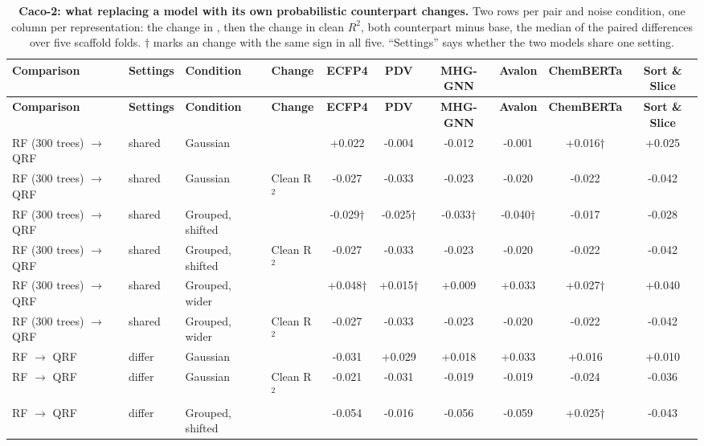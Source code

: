 \begin{landscape}
{\AFtablefont
\begin{longtable}{llllcccccc}
\caption{\textbf{Caco-2: what replacing a model with its own probabilistic counterpart changes.}
Two rows per pair and noise condition, one column per representation: the change in \aucnorm{}, then the change in clean $R^2$, both counterpart minus base, the median of the paired differences over five scaffold folds. $\dagger$ marks an \aucnorm{} change with the same sign in all five. ``Settings'' says whether the two models share one setting.}
\label{app:noise:counterparts_caco2}\\
\toprule
\textbf{Comparison} & \textbf{Settings} & \textbf{Condition} & \textbf{Change} & \textbf{ECFP4} & \textbf{PDV} & \textbf{MHG-GNN} & \textbf{Avalon} & \textbf{ChemBERTa} & \textbf{Sort \& Slice} \\
\midrule
\endfirsthead
\toprule
\textbf{Comparison} & \textbf{Settings} & \textbf{Condition} & \textbf{Change} & \textbf{ECFP4} & \textbf{PDV} & \textbf{MHG-GNN} & \textbf{Avalon} & \textbf{ChemBERTa} & \textbf{Sort \& Slice} \\
\midrule
\endhead
RF (300 trees) $\rightarrow$ QRF & shared & Gaussian & \aucnorm{} & +0.022 & -0.004 & -0.012 & -0.001 & +0.016† & +0.025 \\
RF (300 trees) $\rightarrow$ QRF & shared & Gaussian & Clean R$^2$ & -0.027 & -0.033 & -0.023 & -0.020 & -0.022 & -0.042 \\
RF (300 trees) $\rightarrow$ QRF & shared & Grouped, shifted & \aucnorm{} & -0.029† & -0.025† & -0.033† & -0.040† & -0.017 & -0.028 \\
RF (300 trees) $\rightarrow$ QRF & shared & Grouped, shifted & Clean R$^2$ & -0.027 & -0.033 & -0.023 & -0.020 & -0.022 & -0.042 \\
RF (300 trees) $\rightarrow$ QRF & shared & Grouped, wider & \aucnorm{} & +0.048† & +0.015† & +0.009 & +0.033 & +0.027† & +0.040 \\
RF (300 trees) $\rightarrow$ QRF & shared & Grouped, wider & Clean R$^2$ & -0.027 & -0.033 & -0.023 & -0.020 & -0.022 & -0.042 \\
RF $\rightarrow$ QRF & differ & Gaussian & \aucnorm{} & -0.031 & +0.029 & +0.018 & +0.033 & +0.016 & +0.010 \\
RF $\rightarrow$ QRF & differ & Gaussian & Clean R$^2$ & -0.021 & -0.031 & -0.019 & -0.019 & -0.024 & -0.036 \\
RF $\rightarrow$ QRF & differ & Grouped, shifted & \aucnorm{} & -0.054 & -0.016 & -0.056 & -0.059 & +0.025† & -0.043 \\

\end{longtable}}
\end{landscape}
